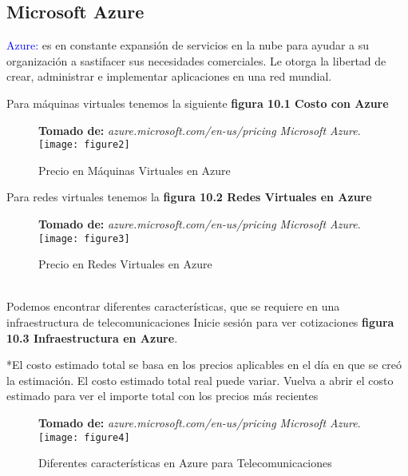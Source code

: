 \subsection{Microsoft Azure}

\textcolor{blue}{Azure:} es en constante expansión de servicios en la nube para ayudar a su organización a sastifacer sus necesidades comerciales. Le otorga la libertad de crear, administrar e implementar aplicaciones en una red mundial.

Para máquinas virtuales tenemos la siguiente \textbf{figura 10.1 Costo con Azure}

\begin{figure}[htbp]
 \textbf{Tomado de:} \textit{azure.microsoft.com/en-us/pricing Microsoft Azure}.
  \centering
    {\texttt{[image: figure2]}}%
  \caption{Precio en Máquinas Virtuales en Azure}
  \label{fig:fig2subfig}
\end{figure}
Para redes virtuales tenemos la \textbf{figura 10.2 Redes Virtuales en Azure}
\begin{figure}[htbp]
 \textbf{Tomado de:} \textit{azure.microsoft.com/en-us/pricing Microsoft Azure}.
  \centering
    {\texttt{[image: figure3]}}%
  \caption{Precio en Redes Virtuales en Azure}
  \label{fig:fig2subfig}
\end{figure}
%
\\
Podemos encontrar diferentes características, que se requiere en una infraestructura de telecomunicaciones 
Inicie sesión para ver cotizaciones  \textbf{figura 10.3 Infraestructura en Azure}.

*El costo estimado total se basa en los precios aplicables en el día en que se creó la estimación. El costo estimado total real puede variar. Vuelva a abrir el costo estimado para ver el importe total con los precios más recientes
\\
\begin{figure}[htbp]
 \textbf{Tomado de:} \textit{azure.microsoft.com/en-us/pricing Microsoft Azure}.
  \centering
    {\texttt{[image: figure4]}}%
  \caption{Diferentes características en Azure para Telecomunicaciones}
  \label{fig:fig2subfig}
\end{figure}

